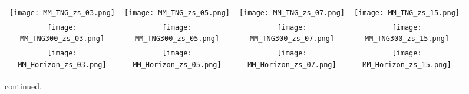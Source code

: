 \documentclass[twocolumn]{aastex631}
\begin{document}
\begin{figure*}
\centering
\begin{tabular}{c c c c}
{\texttt{[image: MM\_TNG\_zs\_03.png]}}&
\hspace*{-0.5cm} 
{\texttt{[image: MM\_TNG\_zs\_05.png]}}&
\hspace*{-0.5cm} 
{\texttt{[image: MM\_TNG\_zs\_07.png]}}&
\hspace*{-0.5cm} 
{\texttt{[image: MM\_TNG\_zs\_15.png]}}\\
{\texttt{[image: MM\_TNG300\_zs\_03.png]}}&
\hspace*{-0.5cm} 
{\texttt{[image: MM\_TNG300\_zs\_05.png]}}&
\hspace*{-0.5cm} 
{\texttt{[image: MM\_TNG300\_zs\_07.png]}}&
\hspace*{-0.5cm} 
{\texttt{[image: MM\_TNG300\_zs\_15.png]}}\\
{\texttt{[image: MM\_Horizon\_zs\_03.png]}}&
\hspace*{-0.5cm} 
{\texttt{[image: MM\_Horizon\_zs\_05.png]}}&
\hspace*{-0.5cm} 
{\texttt{[image: MM\_Horizon\_zs\_07.png]}}&
\hspace*{-0.5cm} 
{\texttt{[image: MM\_Horizon\_zs\_15.png]}}\\
\end{tabular}
\caption{
continued.
}
\end{figure*} 
\end{document}
